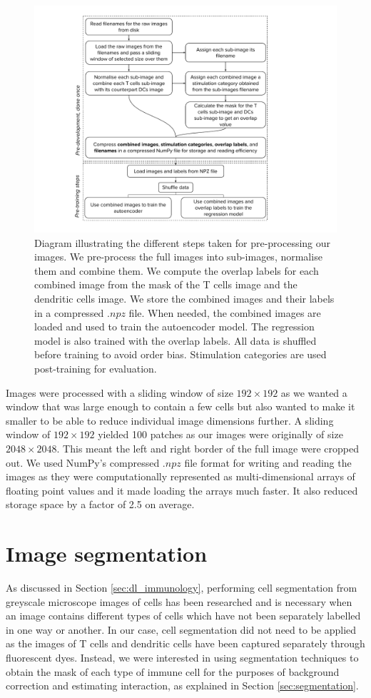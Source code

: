 \begin{figure}[h!]
    \centering
    \includegraphics[width=.6\textwidth]{dissertation/figures/preprocessing_steps.pdf}
    \caption{Diagram illustrating the different steps taken for pre-processing our images. We pre-process the full images into sub-images, normalise them and combine them. We compute the overlap labels for each combined image from the mask of the T cells image and the dendritic cells image. We store the combined images and their labels in a compressed $.npz$ file. When needed, the combined images are loaded and used to train the autoencoder model. The regression model is also trained with the overlap labels. All data is shuffled before training to avoid order bias. Stimulation categories are used post-training for evaluation.}
    \label{fig:preprocessing}
\end{figure}

Images were processed with a sliding window of size $192\times192$ as we wanted a window that was large enough to contain a few cells but also wanted to make it smaller to be able to reduce individual image dimensions further. A sliding window of $192\times192$ yielded 100 patches as our images were originally of size $2048\times2048$. This meant the left and right border of the full image were cropped out. We used NumPy's compressed $.npz$ file format for writing and reading the images as they were computationally represented as multi-dimensional arrays of floating point values and it made loading the arrays much faster. It also reduced storage space by a factor of 2.5 on average. 

\section{Image segmentation}

As discussed in Section \ref{sec:dl_immunology}, performing cell segmentation from greyscale microscope images of cells has been researched and is necessary when an image contains different types of cells which have not been separately labelled in one way or another. In our case, cell segmentation did not need to be applied as the images of T cells and dendritic cells have been captured separately through fluorescent dyes. Instead, we were interested in using segmentation techniques to obtain the mask of each type of immune cell for the purposes of background correction and estimating interaction, as explained in Section \ref{sec:segmentation}.

